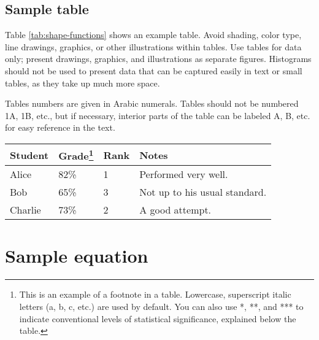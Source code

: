 \documentclass[9pt,twocolumn,twoside,lineno]{gsajnl}
\begin{document}

\subsection{Sample table}

Table \ref{tab:shape-functions} shows an example table. Avoid shading, color type, line drawings, graphics, or other illustrations within tables. Use tables for data only; present drawings, graphics, and illustrations as separate figures. Histograms should not be used to present data that can be captured easily in text or small tables, as they take up much more space.

Tables numbers are given in Arabic numerals. Tables should not be numbered 1A, 1B, etc., but if necessary, interior parts of the table can be labeled A, B, etc. for easy reference in the text.

\begin{table*}[p]
\centering
\caption{Students and their grades}
\begin{tableminipage}{\textwidth}
\begin{tabularx}{\textwidth}{@{}XXXX@{}}
\hline
{\bf Student} & {\bf Grade}\footnote{This is an example of a footnote in a table. Lowercase, superscript italic letters (a, b, c, etc.) are used by default. You can also use *, **, and *** to indicate conventional levels of statistical significance, explained below the table.} & {\bf Rank} & {\bf Notes} \\
\hline
Alice & 82\% & 1 & Performed very well.\\
Bob & 65\% & 3 & Not up to his usual standard.\\
Charlie & 73\% & 2 & A good attempt.\\
\hline
\end{tabularx}
  \label{tab:shape-functions}
\end{tableminipage}
\end{table*}

\section{Sample equation}
\end{document}
